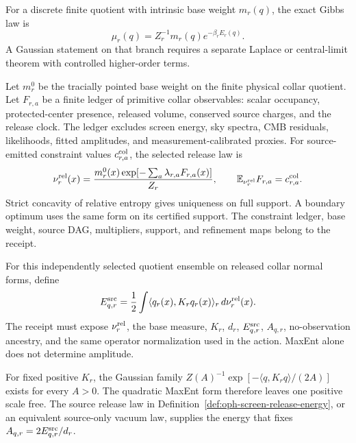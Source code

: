 \begin{remark}
For a discrete finite quotient with intrinsic base weight \(m_r(q)\), the exact Gibbs law is
\[
  \mu_r(q)=Z_r^{-1}m_r(q)e^{-\beta_r E_r(q)}.
\]
A Gaussian statement on that branch requires a separate Laplace or central-limit theorem with
controlled higher-order terms.
\end{remark}

\begin{definition}\label{def:oph-screen-release-energy}
Let \(m_r^0\) be the tracially pointed base weight on the finite physical collar quotient.
Let \(F_{r,a}\) be a finite ledger of primitive collar observables: scalar occupancy,
protected-center presence, released volume, conserved source charges, and the release clock.
The ledger excludes screen energy, sky spectra, CMB residuals, likelihoods, fitted amplitudes,
and measurement-calibrated proxies.  For source-emitted constraint values
\(c_{r,a}^{\rm col}\), the selected release law is
\[
  \nu^{\rm rel}_r(x)=\frac{m_r^0(x)
  \exp[-\sum_a\lambda_{r,a}F_{r,a}(x)]}{Z_r},
  \qquad
  \mathbb E_{\nu_r^{\rm rel}}F_{r,a}=c_{r,a}^{\rm col}.
\]
Strict concavity of relative entropy gives uniqueness on full support.  A boundary optimum uses
the same form on its certified support.  The constraint ledger, base weight, source DAG,
multipliers, support, and refinement maps belong to the receipt.

For this independently selected quotient ensemble on released collar normal forms, define
\[
  E^{\rm src}_{q,r}
  =\frac12\int \langle q_r(x),K_rq_r(x)\rangle_r\,d\nu^{\rm rel}_r(x).
\]
The receipt must expose \(\nu^{\rm rel}_r\), the base measure, \(K_r\), \(d_r\),
\(E^{\rm src}_{q,r}\), \(A_{q,r}\), no-observation ancestry, and the same operator normalization
used in the action.  MaxEnt alone does not determine amplitude.
\end{definition}

\begin{proposition}\label{prop:oph-screen-amplitude-nogo}
For fixed positive \(K_r\), the Gaussian family
\(Z(A)^{-1}\exp[-\langle q,K_rq\rangle/(2A)]\) exists for every \(A>0\).
The quadratic MaxEnt form therefore leaves one positive scale free.  The source release law in
Definition~\ref{def:oph-screen-release-energy}, or an equivalent source-only vacuum law, supplies
the energy that fixes \(A_{q,r}=2E^{\rm src}_{q,r}/d_r\).
\end{proposition}

